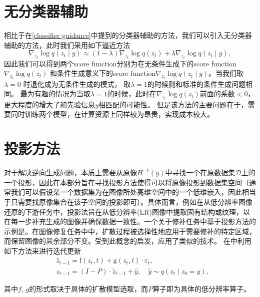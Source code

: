 \section{无分类器辅助}
相比于在\ref{classifier guidance}中提到的分类器辅助的方法，我们可以引入无分类器辅助的方法，此时我们采用如下逼近方法
\begin{equation}
    \nabla_{{z}_t} \log q\left({z}_t \mid y\right)\approx (1-\lambda)\nabla_{{z}_t} \log q\left({z}_t\right)+\lambda \nabla_{{z}_t} \log q\left( {z}_t \mid y \right),
\end{equation}
因此我们可以得到两个score function分别为在无条件生成下的score function $\nabla_{{z}_t} \log q\left({z}_t\right)$ 和条件生成意义下的score function$\nabla_{{z}_t} \log q\left( {z}_t \mid y \right)$。当我们取$\lambda=0$ 时退化成为无条件生成的模式， 取$\lambda=1$的时候则和标准的条件生成问题相同。 最为有趣的情况为当取$\lambda=1$的时候，此时在$\nabla_{{z}_t} \log q\left({z}_t\right)$前面的系数$<0$，更大程度的增大了和先验信息$y$相匹配的可能性。 但是该方法的主要问题在于，需要同时训练两个模型，在计算资源上同样较为昂贵，实现成本较大。 

\section{投影方法}
\label{projection based}
对于解决逆向生成问题，本质上需要从原像$H^{-1}(y)$中寻找一个在原数据集$\mathcal{D}$上的一个投影，因此在本部分旨在寻找投影方法使得可以将原像投影到数据集空间（通常我们可以假设某一个数据集为在图像所处高维空间中的一个低维嵌入，因此相当于只需要找原像集合在该子空间的投影即可）。具体而言，例如在从低分辨率图像还原的下游任务中，投影法旨在从低分辨率(LR)图像中提取固有结构或纹理，以在每一步补充生成的图像并确保数据一致性。一个关于修补任务中基于投影方法的示例是\cite{PnP}。在图像修复任务中中，扩散过程被选择性地应用于需要修补的特定区域，而保留图像的其余部分不变。受到此概念的启发，\cite{red_diff}应用了类似的技术。 
在\cite{MCG}中利用如下方法来进行迭代更新
\begin{align} & \hat{{z}}_{t-1}=\mathrm{f}\left({z}_t, t\right)+\mathrm{g}\left({z}_t, t\right) \cdot \varepsilon_t, \\ & {z}_{t-1}=({I}-{P}) \cdot \hat{{z}}_{t-1}+\hat{{y}}, \quad \hat{{y}} \sim q\left({z}_t \mid {z}_0=y\right),\end{align}

其中$f$, $g$的形式取决于具体的扩散模型选取，而$P$算子即为具体的低分辨率算子。


